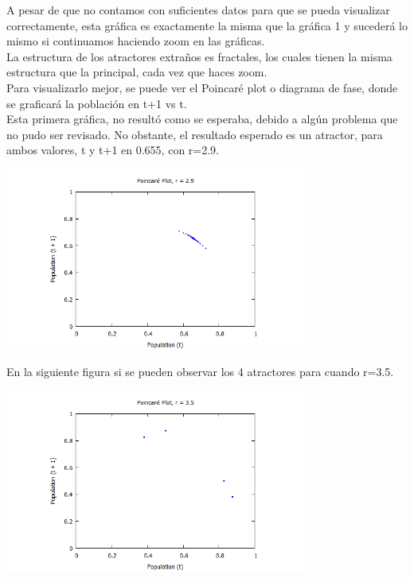 \documentclass[12pt]{article}
\begin{document}
A pesar de que no contamos con suficientes datos para que se pueda visualizar correctamente, esta gráfica es exactamente la misma que la gráfica 1 y sucederá lo mismo si continuamos haciendo zoom en las gráficas. \\

La estructura de los atractores extraños es fractales, los cuales tienen la misma estructura que la principal, cada vez que haces zoom. \\

Para visualizarlo mejor, se puede ver el Poincaré plot o diagrama de fase, donde se graficará la población en t+1 vs t.  \\

Esta primera gráfica, no resultó como se esperaba, debido a algún problema que no pudo ser revisado. No obstante, el resultado esperado es un atractor, para ambos valores, t y t+1 en 0.655, con r=2.9. 

\begin{center}
 \includegraphics[height=6cm]{6.png}
 \end{center}

En la siguiente figura si se pueden observar los 4 atractores para cuando r=3.5.

\begin{center}
 \includegraphics[height=6cm]{7.png}
 \end{center}
\end{document}
